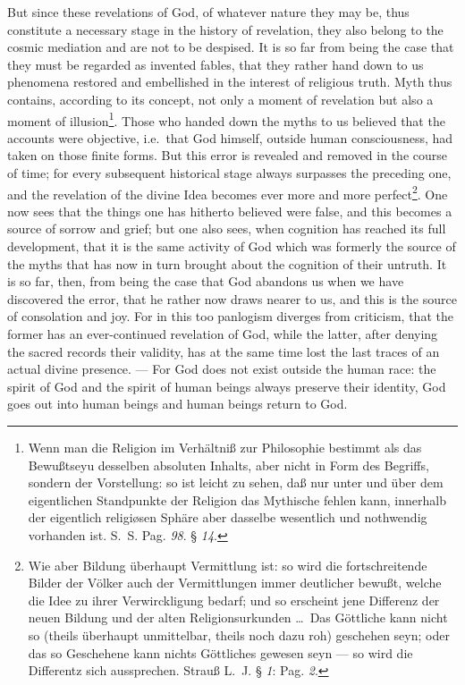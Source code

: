 \documentclass[12pt]{book}
\newcommand{\opage}[1]{\marginnote{\footnotesize\textit{[#1]}}}
\begin{document}
But since these revelations of God, of whatever
\opage{132}\setcounter{footnote}{0}%
nature they may be, thus constitute a necessary stage in the history of
revelation, they also belong to the cosmic mediation and are not to be
despised. It is so far from being the case that they must be regarded as
invented fables, that they rather hand down to us phenomena restored and
embellished in the interest of religious truth. Myth thus contains, according
to its concept, not only a moment of revelation but also a moment of
illusion\footnote{Wenn man die
Religion im Verhältniß zur Philosophie bestimmt als das Bewußtseyu desselben
absoluten Inhalts, aber nicht in Form des Begriffs, sondern der Vorstellung: so
ist leicht zu sehen, daß nur unter und über dem eigentlichen Standpunkte der
Religion das Mythische fehlen kann, innerhalb der eigentlich religiøsen Sphäre
aber dasselbe wesentlich und nothwendig vorhanden ist. S.~S. Pag. \textit{98}.
§ \textit{14}.}. Those who handed down the myths to us believed that the
accounts were objective, i.e.\ that God himself, outside human consciousness,
had taken on those finite forms. But this error is revealed and removed in the
course of time; for every subsequent historical stage always surpasses the
preceding one, and the revelation of the divine Idea becomes ever more and more
perfect\footnote{Wie aber Bildung
überhaupt Vermittlung ist: so wird die fortschreitende Bilder der Völker auch
der Vermittlungen immer deutlicher bewußt, welche die Idee zu ihrer
Verwirckligung bedarf; und so erscheint jene Differenz der neuen Bildung und
der alten Religionsurkunden \ldots\ Das Göttliche kann nicht so (theils
überhaupt unmittelbar, theils noch dazu roh) geschehen seyn; oder das so
Geschehene kann nichts Göttliches gewesen seyn --- so wird die Differentz sich
aussprechen. Strauß L.~J. § \textit{1}: Pag. \textit{2}.}. One now sees that
the things one has hitherto believed were false, and this becomes a source of
sorrow and grief; but one also sees, when cognition has reached its full
development, that it is the same activity of God which was formerly the source
of
\opage{133} the myths that has now in turn brought about the cognition of their
untruth. It is so far, then, from being the case that God abandons us when we
have discovered the error, that he rather now draws nearer to us, and this is
the source of consolation and joy. For in this too panlogism diverges from
criticism, that the former has an ever-continued revelation of God, while the
latter, after denying the sacred records their validity, has at the same time
lost the last traces of an actual divine presence. --- For God does not exist
outside the human race: the spirit of God and the spirit of human beings always
preserve their identity, God goes out into human beings and human beings return
to God.
\end{document}
